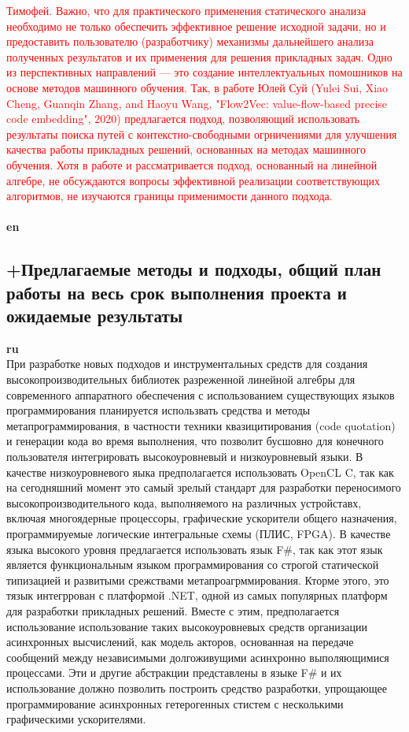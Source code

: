 \documentclass[12pt]{article}  %
\theoremstyle{remark}
\newcommand{\checkme}[1]{\textcolor{red}{#1}}
\begin{document}
\checkme{Тимофей. Важно, что для практического применения статического анализа необходимо не только обеспечить эффективное решение исходной задачи, но и предоставить пользователю (разработчику) механизмы дальнейшего анализа полученных результатов и их применения для решения прикладных задач. Одно из перспективных направлений --- это создание интеллектуальных помошников на основе методов машинного обучения. Так, в работе Юлей Суй (Yulei Sui, Xiao Cheng, Guanqin Zhang, and Haoyu Wang, "Flow2Vec: value-flow-based precise code embedding", 2020) предлагается подход, позволяющий использовать результаты поиска путей с контекстно-свободными огрничениями для улучшения качества работы прикладных решений, основанных на методах машинного обучения. Хотя в работе и рассматривается подход, основанный на линейной алгебре, не обсуждаются вопросы эффективной реализации соответствующих алгоритмов, не изучаются границы применимости данного подхода.}
\\
\\
\textbf{en}\\


\subsection{+Предлагаемые методы и подходы, общий план работы на весь срок выполнения проекта и ожидаемые результаты }

\textbf{ru}\\

При разработке новых подходов и инструментальных средств для создания высокопроизводительных библиотек разреженной линейной алгебры для современного аппаратного обеспечения с использованием существующих языков программирования планируется использвать средства и методы метапрограммирования, в частности техники квазицитирования (code quotation) и генерации кода во время выполнения, что позволит бусшовно для конечного пользователя интегрировать высокоуровневый и низкоуровневый языки. В качестве низкоуровневого яыка предполагается использовать OpenCL C, так как на сегодняшний момент это самый зрелый стандарт для разработки переносимого высокопроизводительного кода, выполняемого на различных устройставх, включая многоядерные процессоры, графические ускорители общего назначения, программируемые логические интегральные схемы (ПЛИС, FPGA). В качестве языка высокого уровня предлагается использовать язык F\#, так как этот язык является функциональным языком программирования со строгой статической типизацией и развитыми срежствами метапроагрммирования. Кторме этого, это тязык интегррован с платформой .NET, одной из самых популярных платформ для разработки прикладных решений. Вместе с этим, предполагается использование использование таких высокоуровневых средств организации асинхронных высчислений, как модель акторов, основанная на передаче сообщений между независимыми долгоживущими асинхронно выполяющимися процессами. Эти и другие абстракции представлены в языке F\# и их использование должно позволить построить средство разработки, упрощающее программирование асинхронных гетерогенных стистем с несколькими графическими ускорителями.
\end{document}
